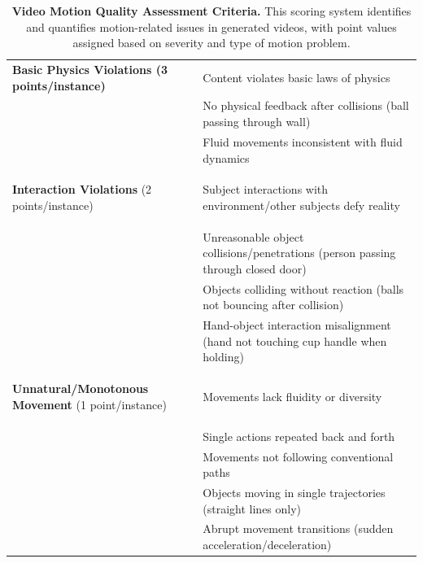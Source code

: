 \documentclass{article}
\begin{document}
\begin{table}[h]
\begin{tabular}{>{\raggedright\arraybackslash\bfseries}p{4cm}>{\raggedright\arraybackslash}p{11cm}}
\textbf{Basic Physics Violations} \newline (3 points/instance) & 
Content violates basic laws of physics\\[0.5ex]
& No physical feedback after collisions (ball passing through wall)\\[0.5ex]
& Fluid movements inconsistent with fluid dynamics\\[0.5ex]
\midrule

\textbf{Interaction Violations} \newline (2 points/instance) & 
Subject interactions with environment/other subjects defy reality\\[0.5ex]
& Unreasonable object collisions/penetrations (person passing through closed door)\\[0.5ex]
& Objects colliding without reaction (balls not bouncing after collision)\\[0.5ex]
& Hand-object interaction misalignment (hand not touching cup handle when holding)\\[0.5ex]
\midrule

\textbf{Unnatural/Monotonous Movement} \newline (1 point/instance) & 
Movements lack fluidity or diversity\\[0.5ex]
& Single actions repeated back and forth\\[0.5ex]
& Movements not following conventional paths\\[0.5ex]
& Objects moving in single trajectories (straight lines only)\\[0.5ex]
& Abrupt movement transitions (sudden acceleration/deceleration)\\[0.5ex]
\bottomrule
\end{tabular}
\caption{\textbf{Video Motion Quality Assessment Criteria.} This scoring system identifies and quantifies motion-related issues in generated videos, with point values assigned based on severity and type of motion problem.}
\label{tab:motion_quality_assessment}
\end{table}
\end{document}
